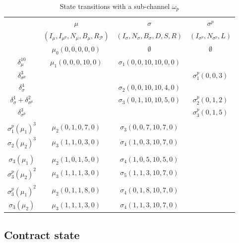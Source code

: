 \documentclass{llncs}
\begin{document}
\begin{table}[t]
  \begin{tabularx}{\textwidth}{| S | C | C | C |}
       & $\mu$ & $\sigma$ & $\sigma^p$ \\ 
       & $(I_\mu,I_{\mu^p},N_\mu,B_\mu,R_\mathcal{P})$ & $(I_\sigma,N_\sigma,B_\sigma,D,S,R)$ & $(I_{\sigma^p},N_{\sigma^p},L)$ \\
  \hhline{~===}
       & $\mu_0(0,0,0,0,0)$  & $\emptyset$          & $\emptyset$ \\ 
      $\delta_\mu^{10}$      & $\mu_1(0,0,0,10,0)$ & $\sigma_1(0,0,10,10,0,0)$    &             \\
      $\delta_{\sigma^p}^3$  &                &                      & $\sigma^p_1(0,0,3)$   \\
      $\delta_\sigma^4$ &    & $\sigma_2(0,0,10,10,4,0)$  & \\
      $\delta_\sigma^1 + \delta_{\sigma^p}^2$ & & $\sigma_3(0,1,10,10,5,0)$  & $\sigma^p_2(0,1,2)$   \\
      $\delta_{\sigma^p}^3$  &                &                      & $\sigma^p_3(0,1,5)$   \\
       \\
      $\sigma^p_1(\mu_1)^3$ & $\mu_2(0,1,0,7,0)$ & $\sigma_3(0,0,7,10,7,0)$ & \\
      $\sigma_2(\mu_2)^3$ & $\mu_3(1,1,0,3,0)$ & $\sigma_4(1,0,3,10,7,0)$ & \\
       \\
      $\sigma_3(\mu_1)$ & $\mu_2(1,0,1,5,0)$ & $\sigma_4(1,0,5,10,5,0)$ & \\
      $\sigma^p_3(\mu_2)^2$ & $\mu_3(1,1,1,3,0)$ & $\sigma_5(1,1,3,10,7,0)$ & \\
       \\
      $\sigma^p_3(\mu_1)^2$ & $\mu_2(0,1,1,8,0)$ & $\sigma_4(0,1,8,10,7,0)$ & \\
      $\sigma_3(\mu_2)$ & $\mu_3(1,1,1,3,0)$ & $\sigma_4(1,1,3,10,7,0)$ & \\
  \end{tabularx}
  \medskip
    \caption{State transitions with a sub-channel $\omega_p$}
\end{table}

\subsection{Contract state}
\end{document}
